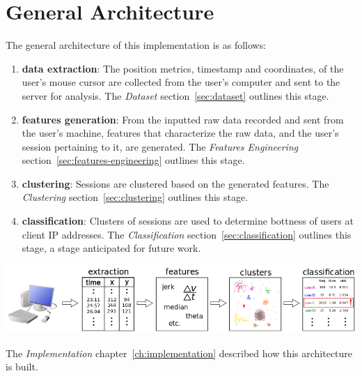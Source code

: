 
\section{General Architecture}\label{sec:general-arcitecture}
The general architecture of this implementation is as follows:
\begin{enumerate}
    \item \textbf{data extraction}: The position metrics, timestamp and coordinates, of the user's mouse cursor are collected from the user's computer and sent to the server for analysis. The \textit{Dataset} section~\ref{sec:dataset} outlines this stage.
    \item \textbf{features generation}: From the inputted raw data recorded and sent from the user's machine, features that characterize the raw data, and the user's session pertaining to it, are generated. The \textit{Features Engineering} section~\ref{sec:features-engineering} outlines this stage.
    \item \textbf{clustering}: Sessions are clustered based on the generated features. The \textit{Clustering} section~\ref{sec:clustering} outlines this stage.
    \item \textbf{classification}: Clusters of sessions are used to determine bottness of users at client IP addresses. The \textit{Classification} section~\ref{sec:classification} outlines this stage, a stage anticipated for future work.
\end{enumerate}
\begin{center}
\includegraphics[width=1\columnwidth]{figures/general_architecture}
\end{center}

The \textit{Implementation} chapter~\ref{ch:implementation} described how this architecture is built.
